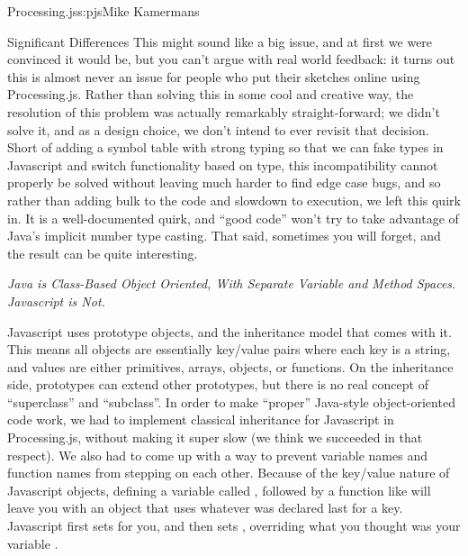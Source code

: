 \begin{aosachapter}{Processing.js}{s:pjs}{Mike Kamermans}
\begin{aosasect1}{Significant Differences}
This might sound like a big issue, and at first we were convinced it
would be, but you can't argue with real world feedback: it turns out
this is almost never an issue for people who put their sketches online
using Processing.js. Rather than solving this in some cool and
creative way, the resolution of this problem was actually remarkably
straight-forward; we didn't solve it, and as a design choice, we don't
intend to ever revisit that decision. Short of adding a symbol table
with strong typing so that we can fake types in Javascript and switch
functionality based on type, this incompatibility cannot properly be
solved without leaving much harder to find edge case bugs, and so
rather than adding bulk to the code and slowdown to execution, we left
this quirk in. It is a well-documented quirk, and ``good code'' won't
try to take advantage of Java's implicit number type casting. That
said, sometimes you will forget, and the result can be quite
interesting.

\emph{Java is Class-Based Object Oriented, With Separate Variable and Method Spaces. Javascript is Not.}

Javascript uses prototype objects, and the inheritance model that
comes with it. This means all objects are essentially key/value pairs
where each key is a string, and values are either primitives, arrays,
objects, or functions. On the inheritance side, prototypes can extend
other prototypes, but there is no real concept of ``superclass'' and
``subclass''. In order to make ``proper'' Java-style object-oriented code
work, we had to implement classical inheritance for Javascript in
Processing.js, without making it super slow (we think we succeeded in
that respect). We also had to come up with a way to prevent variable
names and function names from stepping on each other. Because of the
key/value nature of Javascript objects, defining a variable called
, followed by a function like  will leave
you with an object that uses whatever was declared last for a
key. Javascript first sets  for you, and
then sets , overriding what
you thought was your variable .


\end{aosasect1}
\end{aosachapter}
